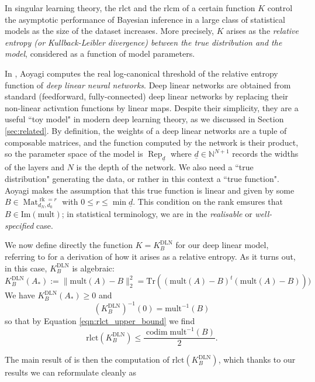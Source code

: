 \documentclass[a4paper]{amsart}
\DeclareMathOperator{\rk}{rk}
\DeclareMathOperator{\Rep}{\mathrm{Rep}}
\DeclareMathOperator{\Mat}{\mathrm{Mat}}
\DeclareMathOperator{\codim}{\mathrm{codim}}
\newcommand{\N}{\mathbb{N}}
\newcommand{\ud}{\underline{d}}
\newcommand{\Tr}{\mathrm{Tr}}
\newcommand{\rlct}{\mathrm{rlct}}
\newcommand{\DLN}{\mathrm{DLN}}
\newcommand{\mult}{\mathrm{mult}}
\theoremstyle{plain}
\begin{document}
In singular learning theory, the rlct and the rlcm of a certain function $K$ control the asymptotic performance of Bayesian inference in a large class of statistical models as the size of the dataset increases. More precisely, $K$ arises as the \emph{relative entropy (or Kullback-Leibler divergence) between the true distribution and the model}, considered as a function of model parameters. 

In \cite{aoyagi}, Aoyagi computes the real log-canonical threshold of the relative entropy function of \emph{deep linear neural networks}. Deep linear networks are obtained from standard (feedforward, fully-connected) deep linear networks by replacing their non-linear activation functions by linear maps. Despite their simplicity, they are a useful ``toy model" in modern deep learning theory, as we discussed in Section \ref{sec:related}. By definition, the weights of a deep linear networks are a tuple of composable matrices, and the function computed by the network is their product, so the parameter space of the model is $\Rep_{\ud}$ where $\ud\in \N^{N+1}$ records the widths of the layers and $N$ is the depth of the network. We also need a ``true distribution" generating the data, or rather in this context a ``true function". Aoyagi makes the assumption that this true function is linear and given by some $B\in \Mat_{d_N,d_0}^{\rk=r}$ with $0\leq r\leq \min{\ud}$. This condition on the rank emsures that $B\in \mathrm{Im}(\mult)$; in statistical terminology, we are in the \emph{realisable} or \emph{well-specified} case.

We now define directly the function $K=K^{\DLN}_B$ for our deep linear model, referring to \cite{aoyagi} for a derivation of how it arises as a relative entropy. As it turns out, in this case, $K^{\DLN}_B$ is algebraic:
\begin{equation}
    K^{\DLN}_B(A_*):= \| \mult(A)-B \|^2_2 =\Tr((\mult(A)-B)^t (\mult(A)-B))) 
\end{equation}
We have $K^{\DLN}_B(A_*)\geq 0$ and 
\[(K^{\DLN}_B)^{-1}(0)=\mult^{-1}(B)\]
so that by Equation \ref{eqn:rlct_upper_bound} we find
\[
\rlct(K^{\DLN}_B)\leq \frac{\codim \mult^{-1}(B)}{2}.
\]

The main result of \cite{aoyagi} is then the computation of $\rlct(K^{\DLN}_B)$, which thanks to our results we can reformulate cleanly as
\end{document}
